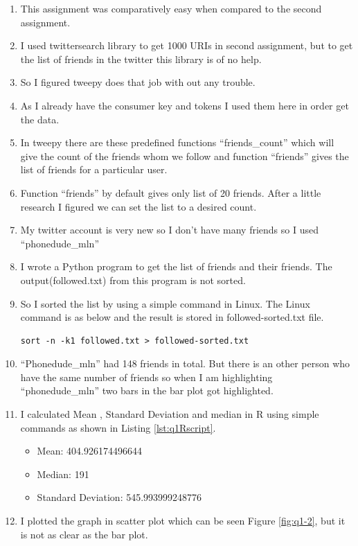 \newpage
\begin{enumerate}
\item This assignment was comparatively easy when compared to the second assignment. 
\item I used twittersearch library to get 1000 URIs in second assignment, but to get the list of friends in the twitter this library is of no help.
\item So I figured tweepy does that job with out any trouble. 
\item As I already have the consumer key and tokens I used them here in order get the data. 
\item In tweepy there are these predefined functions ``friends\_count'' which will give the count of the friends whom we follow and function ``friends'' gives the list of friends for a particular user. 
\item Function ``friends'' by default gives only list of 20  friends. After a little research I figured we can set the list to a desired count.
\item My twitter account is very new so I don't have many friends so I used ``phonedude\_mln''
\item I wrote a Python program to get the list of friends and their friends.  The output(followed.txt) from this program is not sorted. 
\item So I sorted the list by using a simple command in Linux. The Linux command is as below and the result is stored in followed-sorted.txt file.
 \begin{lstlisting}[frame=single]
sort -n -k1 followed.txt > followed-sorted.txt
\end{lstlisting}
\item ``Phonedude\_mln'' had 148 friends in total. But there is an other person who have the same number of friends so when I am highlighting ``phonedude\_mln'' two bars in the bar plot got highlighted. 
\item I calculated Mean , Standard Deviation and median in R using simple commands as shown in Listing \ref{lst:q1Rscript}. 
	\begin{itemize}
		\item Mean:  404.926174496644
		\item Median:  191
		\item Standard Deviation:  545.993999248776
	\end{itemize}
\item I plotted the graph in scatter plot which can be seen Figure \ref{fig:q1-2}, but it is not as clear as the bar plot. 
\end{enumerate}
\newpage

